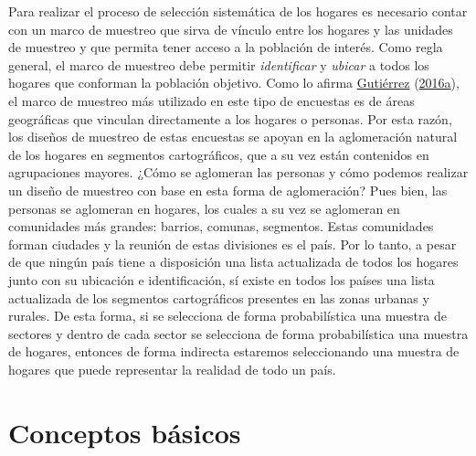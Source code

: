 \documentclass[
  12pt,
  spanish,
]{book}
\begin{document}
Para realizar el proceso de selección sistemática de los hogares es necesario contar con un marco de muestreo que sirva de vínculo entre los hogares y las unidades de muestreo y que permita tener acceso a la población de interés. Como regla general, el marco de muestreo debe permitir \emph{identificar} y \emph{ubicar} a todos los hogares que conforman la población objetivo. Como lo afirma \protect\hyperlink{ref-Gutierrez_2016}{Gutiérrez} (\protect\hyperlink{ref-Gutierrez_2016}{2016a}), el marco de muestreo más utilizado en este tipo de encuestas es de áreas geográficas que vinculan directamente a los hogares o personas. Por esta razón, los diseños de muestreo de estas encuestas se apoyan en la aglomeración natural de los hogares en segmentos cartográficos, que a su vez están contenidos en agrupaciones mayores. ¿Cómo se aglomeran las personas y cómo podemos realizar un diseño de muestreo con base en esta forma de aglomeración? Pues bien, las personas se aglomeran en hogares, los cuales a su vez se aglomeran en comunidades más grandes: barrios, comunas, segmentos. Estas comunidades forman ciudades y la reunión de estas divisiones es el país. Por lo tanto, a pesar de que ningún país tiene a disposición una lista actualizada de todos los hogares junto con su ubicación e identificación, sí existe en todos los países una lista actualizada de los segmentos cartográficos presentes en las zonas urbanas y rurales. De esta forma, si se selecciona de forma probabilística una muestra de sectores y dentro de cada sector se selecciona de forma probabilística una muestra de hogares, entonces de forma indirecta estaremos seleccionando una muestra de hogares que puede representar la realidad de todo un país.

\hypertarget{conceptos-buxe1sicos}{%
\section{Conceptos básicos}\label{conceptos-buxe1sicos}}
\end{document}
